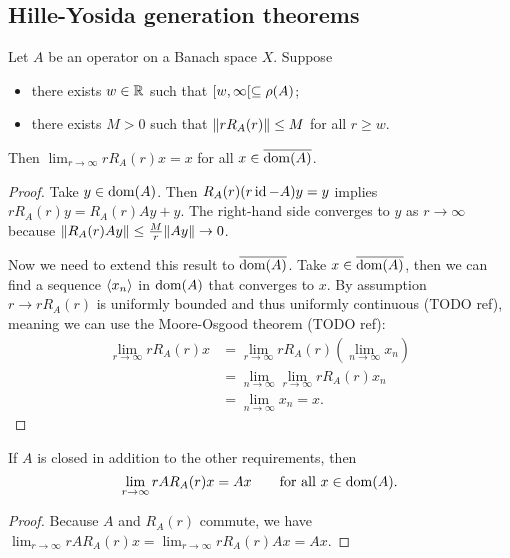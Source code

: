 \subsection{Hille-Yosida generation theorems}
\begin{lemma} \label{resolventLimitLemma}
Let $A$ be an operator on a Banach space $X$. Suppose
\begin{itemize}
\item there exists $w\in \mathbb{R}$ such that $[w,\infty[ \subseteq \rho(A)$;
\item there exists $M>0$ such that $\lVert r R_A(r)\rVert\leq M$ for all $r \geq w$.
\end{itemize}
Then $\lim_{r\to \infty} r R_A(r)x = x$ for all $x\in \overline{\operatorname{dom}(A)}$.
\end{lemma}
\begin{proof}
Take $y\in \operatorname{dom}(A)$. Then $R_A(r)(r\operatorname{id} - A)y = y$ implies $r R_A(r)y = R_A(r)Ay + y$. The right-hand side converges to $y$ as $r\to\infty$ because $\lVert R_A(r)Ay\rVert \leq \frac{M}{r}\lVert Ay\rVert \to 0$.

Now we need to extend this result to $\overline{\operatorname{dom}(A)}$. Take $x\in \overline{\operatorname{dom}(A)}$, then we can find a sequence $\left\langle x_n \right\rangle$ in $\operatorname{dom}(A)$ that converges to $x$. By assumption $r \to r R_A(r)$ is uniformly bounded and thus uniformly continuous (TODO ref), meaning we can use the Moore-Osgood theorem (TODO ref):
\begin{align*}
\lim_{r\to \infty} r R_A(r)x &= \lim_{r\to \infty} r R_A(r)\left(\lim_{n\to\infty}x_n\right) \\
&= \lim_{n\to\infty}\lim_{r\to \infty} r R_A(r)x_n \\
&= \lim_{n\to\infty}x_n = x.
\end{align*}
\end{proof}
\begin{corollary} \label{YosidaApproximantsLemma}
If $A$ is closed in addition to the other requirements, then
\[ \lim_{r\to \infty} r AR_A(r)x = Ax \qquad \text{for all $x\in \operatorname{dom}(A)$.} \]
\end{corollary}
\begin{proof}
Because $A$ and $R_A(r)$ commute, we have $\lim_{r\to \infty} r AR_A(r)x = \lim_{r\to \infty} r R_A(r)Ax =Ax$.
\end{proof}

